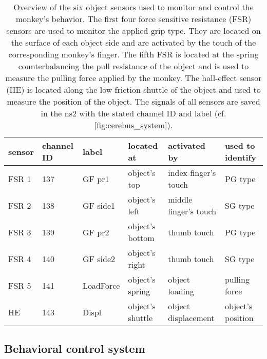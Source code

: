 \begin{table}[]
\footnotesize
\centering
\begin{tabular}{llllll}
\hline
sensor & channel ID & label     & located at       & activated by          & used to identify  \\ \hline
FSR 1  & 137        & GF pr1    & object’s top     & index finger’s touch  & PG type           \\ 
FSR 2  & 138        & GF side1  & object’s left    & middle finger’s touch & SG type           \\ 
FSR 3  & 139        & GF pr2    & object’s bottom  & thumb touch           & PG type           \\ 
FSR 4  & 140        & GF side2  & object’s right   & thumb touch           & SG type           \\ 
FSR 5  & 141        & LoadForce & object’s spring  & object loading        & pulling force     \\ 
HE     & 143        & Displ     & object's shuttle & object displacement   & object’s position \\ \hline
\end{tabular}
 \caption[Overview of six objects sensors to monitor and control the monkey's behavior]{Overview of the six object sensors used to monitor and control the monkey's behavior. The first four force sensitive resistance (FSR) sensors are used to monitor the applied grip type. They are located on the surface of each object side and are activated by the touch of the corresponding monkey's finger. The fifth FSR is located at the spring counterbalancing the pull resistance of the object and is used to measure the pulling force applied by the monkey. The hall-effect sensor (HE) is located along the low-friction shuttle of the object and used to measure the position of the object. The signals of all sensors are saved in the ns2 with the stated channel ID and label (cf. \cref{fig:cerebus_system}).}
 \label{tab:overview_sensors}
\end{table}

\subsection{Behavioral control system}
\label{sec:behavioral_control_system}

